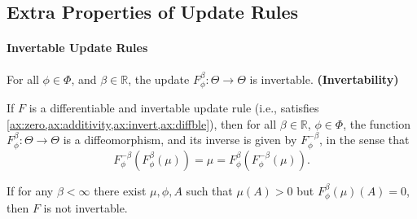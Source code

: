 \begin{subappendices}
    \section{Extra Properties of Update Rules}

    \paragraph{Invertable Update Rules}

    \begin{LrnAxioms}
    	\item For all $\phi\in\Phi$, and $\beta \in \mathbb R$, the update
    	$F^{\beta}_{\phi}: \Theta \to \Theta$ is invertable.
    	\hfill\textbf{(Invertability)} \label{ax:invert}
    \end{LrnAxioms}




    \begin{prop}
    	If $F$ is a differentiable and invertable update rule (i.e., satisfies \cref{ax:zero,ax:additivity,ax:invert,ax:diffble}), then for all $\beta \in \mathbb R$, $\phi \in \Phi$, the function
    	$F^\beta_\phi : \Theta \to \Theta$
    	is a diffeomorphism, and its inverse is given by $F^{-\beta}_\phi$, in the sense that
    	\[
    		F^{-\beta}_\phi( F^{\beta}_\phi (\mu) ) = \mu = F^{\beta}_\phi( F^{-\beta}_\phi (\mu) ).
    	 \]
    \end{prop}



	\begin{coro}
    	If for any $\beta < \infty$ there exist $\mu, \phi, A$ such that
    	$\mu(A) > 0$  but $F^{\beta}_\phi(\mu)(A) = 0$, then $F$ is not invertable.
    \end{coro}



\end{subappendices}
